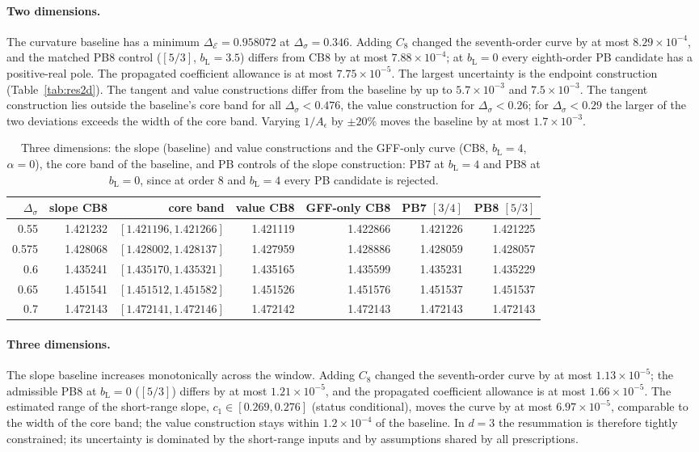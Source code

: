\documentclass[11pt,a4paper]{article}
\numberwithin{equation}{section}
\newcommand{\De}{\Delta_{\mathcal E}}   %
\newcommand{\Ds}{\Delta_\sigma}
\newcommand{\Ae}{A_\epsilon}
\newcommand{\bL}{b_{\mathrm L}}
\newcommand{\sci}[2]{#1\times10^{#2}}
\begin{document}
\paragraph{Two dimensions.} The curvature baseline has a minimum
$\De=0.958072$ at $\Ds=0.346$. Adding $C_8$ changed the seventh-order curve by at most
$\sci{8.29}{-4}$, and the matched PB8 control ($[5/3]$, $\bL=3.5$) differs from CB8 by at most
$\sci{7.88}{-4}$; at $\bL=0$ every eighth-order PB candidate has a positive-real pole. The
propagated coefficient allowance is at most $\sci{7.75}{-5}$. The largest uncertainty is
the endpoint construction (Table~\ref{tab:res2d}). The tangent and value constructions
differ from the baseline by up to $\sci{5.7}{-3}$ and $\sci{7.5}{-3}$. The tangent
construction lies outside the baseline's core band for all $\Ds<0.476$, the value
construction for $\Ds<0.26$; for $\Ds<0.29$ the larger of the two deviations exceeds the
width of the core band. Varying $1/\Ae$ by $\pm20\%$ moves the baseline by at most
$\sci{1.7}{-3}$.

\begin{table}[htbp]\centering\small
\begin{tabular}{@{}r r r r r r r@{}}
\toprule
$\Ds$ & slope CB8 & core band & value CB8 & GFF-only CB8 & PB7 $[3/4]$ & PB8 $[5/3]$\\ \midrule
0.55 & 1.421232 & $[1.421196,1.421266]$ & 1.421119 & 1.422866 & 1.421226 & 1.421225\\
0.575 & 1.428068 & $[1.428002,1.428137]$ & 1.427959 & 1.428886 & 1.428059 & 1.428057\\
0.6 & 1.435241 & $[1.435170,1.435321]$ & 1.435165 & 1.435599 & 1.435231 & 1.435229\\
0.65 & 1.451541 & $[1.451512,1.451582]$ & 1.451526 & 1.451576 & 1.451537 & 1.451537\\
0.7 & 1.472143 & $[1.472141,1.472146]$ & 1.472142 & 1.472143 & 1.472143 & 1.472143\\
\bottomrule
\end{tabular}
\caption{Three dimensions: the slope (baseline) and value constructions and the GFF-only
curve (CB8, $\bL=4$, $\alpha=0$), the core band of the baseline, and PB controls of the slope
construction: PB7 at $\bL=4$ and PB8 at $\bL=0$, since at order 8 and $\bL=4$ every PB
candidate is rejected.}
\label{tab:res3d}
\end{table}

\paragraph{Three dimensions.} The slope baseline increases monotonically across the
window. Adding $C_8$ changed the seventh-order curve by at most $\sci{1.13}{-5}$; the
admissible PB8 at $\bL=0$ ($[5/3]$) differs by at most $\sci{1.21}{-5}$, and the propagated
coefficient allowance is at most $\sci{1.66}{-5}$. The estimated range of the short-range
slope, $c_1\in[0.269,0.276]$ (status conditional), moves the curve by at most $\sci{6.97}{-5}$, comparable to the
width of the core band; the value construction stays within $\sci{1.2}{-4}$ of the
baseline. In $d=3$ the resummation is therefore tightly constrained; its uncertainty is
dominated by the short-range inputs and by assumptions shared by all prescriptions.
\end{document}
